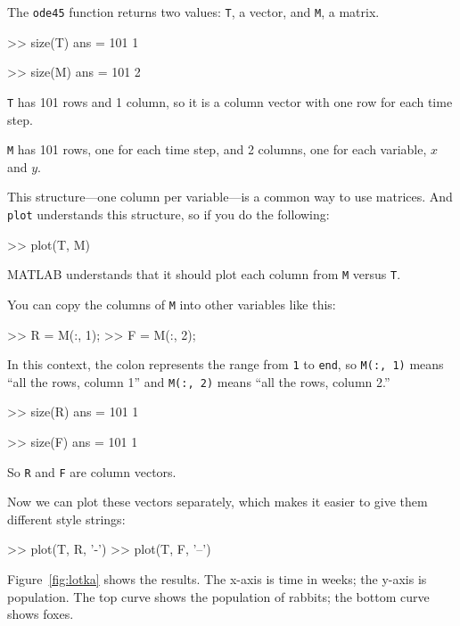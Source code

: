 \documentclass[../../book.tex]{subfiles}
\begin{document}
The \lstinline{ode45} function returns two values: \lstinline{T}, a vector,
and \lstinline{M}, a matrix.

\begin{code}
>> size(T)
ans = 101     1

>> size(M)
ans = 101     2
\end{code}

\lstinline{T} has 101 rows and 1 column, so it is a column vector with one row for
each time step.

\lstinline{M} has 101 rows, one for each time step, and 2 columns, one for each variable,
$x$ and $y$.

This structure---one column per variable---is a common way to
use matrices. And \lstinline{plot} understands this structure, so if you
do the following:

\begin{code}
>> plot(T, M)
\end{code}
MATLAB understands that it should plot each column from \lstinline{M}
versus \lstinline{T}.


You can copy the columns of \lstinline{M} into other variables like
this:

\begin{code}
>> R = M(:, 1);
>> F = M(:, 2);
\end{code}

In this context, the colon represents the range from \lstinline{1} to \lstinline{end},
so \lstinline{M(:, 1)} means ``all the rows, column 1'' and
\lstinline{M(:, 2)} means ``all the rows, column 2.''

\begin{code}
>> size(R)
ans = 101     1

>> size(F)
ans = 101     1
\end{code}

So \lstinline{R} and \lstinline{F} are column vectors.


Now we can plot these vectors separately, which makes it easier to give them different style strings:

\begin{code}
>> plot(T, R, '-')
>> plot(T, F, '--')
\end{code}


Figure~\ref{fig:lotka} shows the results. The x-axis is time in weeks; the y-axis is population.  The top curve shows the population of rabbits; the bottom curve shows foxes.
\end{document}
